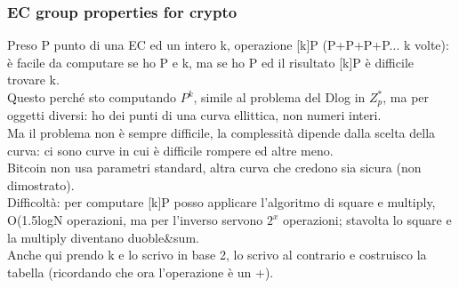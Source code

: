 \documentclass[16px]{article}
\begin{document}
\subsubsection{EC group properties for crypto}
Preso P punto di una EC ed un intero k, operazione [k]P (P+P+P+P... k volte): è facile da computare se ho P e k, ma se ho P ed il risultato [k]P è difficile trovare k.\\ Questo perché sto computando $P^k$, simile al problema del Dlog in $Z_p^*$, ma per oggetti diversi: ho dei punti di una curva ellittica, non numeri interi.\\ Ma il problema non è sempre difficile, la complessità dipende dalla scelta della curva: ci sono curve in cui è difficile rompere ed altre meno.\\ Bitcoin non usa parametri standard, altra curva che credono sia sicura (non dimostrato).\\ Difficoltà: per computare [k]P posso applicare l'algoritmo di square e multiply, O(1.5logN operazioni, ma per l'inverso servono $2^x$ operazioni; stavolta lo square e la multiply diventano duoble\&sum.\\ Anche qui prendo k e lo scrivo in base 2, lo scrivo al contrario e costruisco la tabella (ricordando che ora l'operazione è un +).
\end{document}
